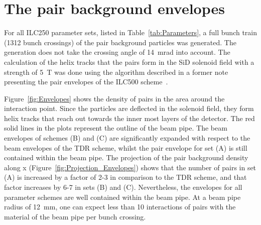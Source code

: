 \section{The pair background envelopes}
\label{sec:Envelopes}
For all ILC250 parameter sets, listed in Table~\ref{tab:Parameters}, a full bunch train (1312 bunch crossings) of the pair background particles was generated.
The \guineapig generation does not take the crossing angle of \SI{14}{\milli\radian} into account.
The calculation of the helix tracks that the pairs form in the SiD solenoid field with a strength of \SI{5}{\tesla} was done using the algorithm described in a former note presenting the pair envelopes of the ILC500 scheme~\cite{HelixProceeding}.

Figure~\ref{fig:Envelopes} shows the density of pairs in the area around the interaction point.
Since the particles are deflected in the solenoid field, they form helix tracks that reach out towards the inner most layers of the detector.
The red solid lines in the plots represent the outline of the beam pipe.
The beam envelopes of schemes (B) and (C) are significantly expanded with respect to the beam envelopes of the TDR scheme, whilst the pair envelope for set (A) is still contained within the beam pipe.
The projection of the pair background density along x (Figure~\ref{fig:Projection_Envelopes}) shows that the number of pairs in set (A) is increased by a factor of 2-3 in comparison to the TDR scheme, and that factor increases by 6-7 in sets (B) and (C).
Nevertheless, the envelopes for all parameter schemes are well contained within the beam pipe.
At a beam pipe radius of \SI{12}{\milli\meter}, one can expect less than 10 interactions of pairs with the material of the beam pipe per bunch crossing.

